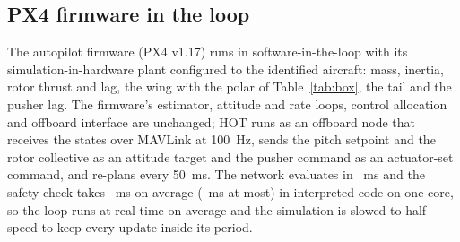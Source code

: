 \subsection{PX4 firmware in the loop}
The autopilot firmware (PX4 v1.17) runs in software-in-the-loop with its simulation-in-hardware plant configured to the identified aircraft: mass, inertia, rotor thrust and lag, the wing with the polar of Table~\ref{tab:box}, the tail and the pusher lag. The firmware's estimator, attitude and rate loops, control allocation and offboard interface are unchanged; HOT runs as an offboard node that receives the states over MAVLink at \SI{100}{Hz}, sends the pitch setpoint and the rotor collective as an attitude target and the pusher command as an actuator-set command, and re-plans every \SI{50}{ms}. The network evaluates in \hotEvalMs{}~ms and the safety check takes \hotCheckMs{}~ms on average (\hotCheckMaxMs{}~ms at most) in interpreted code on one core, so the loop runs at real time on average and the simulation is slowed to half speed to keep every update inside its period.
